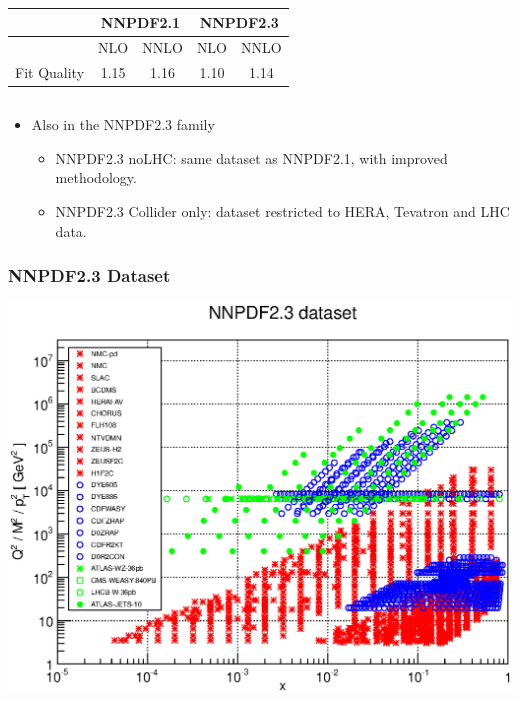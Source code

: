 \documentclass[10pt]{beamer}
\begin{document}
\begin{frame}
\begin{columns}
\begin{column}{0.5\textwidth}
\begin{table}
\scriptsize
\begin{tabular}{|c|c|c||c|c|}
\hline 
& \multicolumn{2}{c||}{\bf NNPDF2.1} & \multicolumn{2}{|c|}{\bf NNPDF2.3}  \\
\hline 
\hline 
  & NLO & NNLO  & NLO  & NNLO  \\
\hline 
Fit Quality  & 1.15 & 1.16  & 1.10 & 1.14     \\
\hline
\end{tabular}
\end{table}

  \end{column}
\end{columns}



\begin{itemize}
\item<2->Also in the NNPDF2.3 family
\begin{itemize}
 \item<1-> NNPDF2.3 noLHC:  same dataset as NNPDF2.1, with improved methodology.
  \item<1->  NNPDF2.3 Collider only: dataset restricted to HERA, Tevatron and LHC data.
\end{itemize}
\end{itemize}
\end{frame}


\begin{frame}
\frametitle{NNPDF2.3 Dataset}
   \includegraphics[width=1.0\textwidth]{kin23}
\end{frame}
\end{document}

